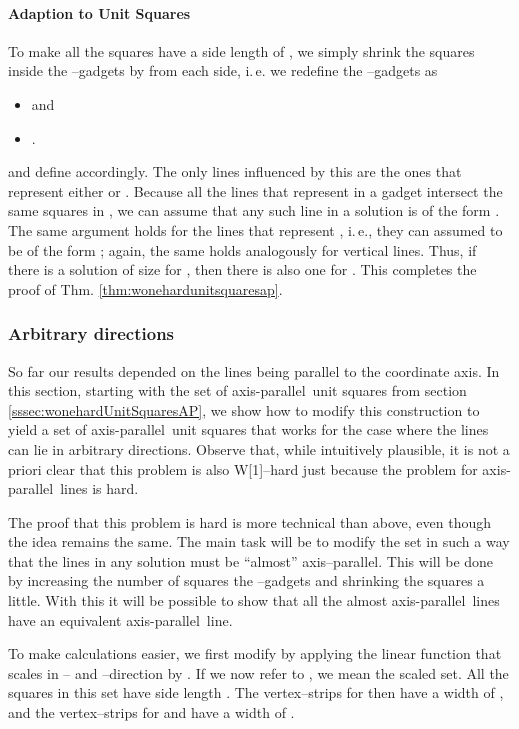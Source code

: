 \documentclass[12pt]{article}
\newcommand{\cclass}[1]{{#1}}
\newcommand{\wone}{\cclass{W[1]}}
\newcommand{\ap}{a.p.\ }
\renewcommand{\ap}{axis-parallel\ }
\begin{document}
\paragraph{Adaption to Unit Squares}
To make all the squares have a side length of , we simply shrink the squares inside the --gadgets by  from each side, i.\,e. we redefine the --gadgets as 
\begin{itemize}
	\item  and 
	\item .
\end{itemize}
and define  accordingly. The only lines influenced by this are the ones that represent either  or . Because all the lines that represent  in a gadget  intersect the same squares in , we can assume that any such line in a solution is of the form . The same argument holds for the lines that represent , i.\,e., they can assumed to be of the form ; again, the same holds analogously for vertical lines. Thus, if there is a solution of size  for , then there is also one for . This completes the proof of Thm. \ref{thm:wonehardunitsquaresap}. 
\subsubsection{Arbitrary directions}\label{sssec:arbitrary}

So far our results depended on the lines being parallel to the coordinate axis. In this section, starting with the set  of \ap unit squares from section \ref{sssec:wonehardUnitSquaresAP}, we show how to modify this construction to yield a set  of \ap unit squares that works for the case where the lines can lie in arbitrary directions. Observe that, while intuitively plausible, it is not a priori clear that this problem is also \wone--hard just because the problem for \ap lines is hard.

The proof that this problem is hard is more technical than above, even though the idea remains the same. The main task will be to modify the set  in such a way that the lines in any solution must be ``almost'' axis--parallel. This will be done by increasing the number of squares the --gadgets and shrinking the squares a little. With this it will be possible to show that all the almost \ap lines have an equivalent \ap line. 

To make calculations easier, we first modify  by applying the linear function that scales in -- and --direction by . If we now refer to , we mean the scaled set. All the squares in this set have side length . The vertex--strips for  then have a width of , and the vertex--strips for  and  have a width of . 
\end{document}
